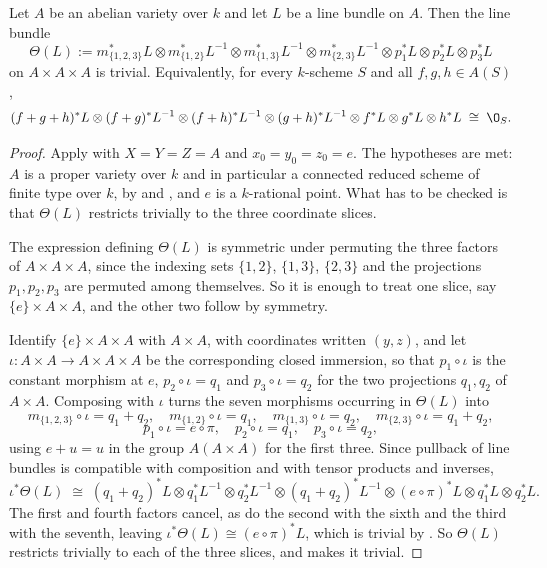 \begin{theorem}
\label{thm:cube-abelian}
Let $A$ be an abelian variety over $k$ and let $L$ be a line bundle on $A$.
Then the line bundle
\[
  \Theta(L):=m_{\{1,2,3\}}^*L\otimes m_{\{1,2\}}^*L^{-1}\otimes
  m_{\{1,3\}}^*L^{-1}\otimes m_{\{2,3\}}^*L^{-1}\otimes
  p_1^*L\otimes p_2^*L\otimes p_3^*L
\]
on $A\times A\times A$ is trivial.  Equivalently, for every $k$-scheme $S$ and
all $f,g,h\in A(S)$,
\[
  (f+g+h)^*L\otimes(f+g)^*L^{-1}\otimes(f+h)^*L^{-1}\otimes(g+h)^*L^{-1}
  \otimes f^*L\otimes g^*L\otimes h^*L\;\cong\;\O_S .
\]
\end{theorem}
\begin{proof}
Apply  with $X=Y=Z=A$ and $x_0=y_0=z_0=e$.  The hypotheses
are met: $A$ is a proper variety over $k$ and in particular a connected reduced
scheme of finite type over $k$, by  and
, and $e$ is a $k$-rational point.  What has to be checked
is that $\Theta(L)$ restricts trivially to the three coordinate slices.

The expression defining $\Theta(L)$ is symmetric under permuting the three
factors of $A\times A\times A$, since the indexing sets $\{1,2\}$, $\{1,3\}$,
$\{2,3\}$ and the projections $p_1,p_2,p_3$ are permuted among themselves.  So
it is enough to treat one slice, say $\{e\}\times A\times A$, and the other two
follow by symmetry.

Identify $\{e\}\times A\times A$ with $A\times A$, with coordinates written
$(y,z)$, and let $\iota\colon A\times A\to A\times A\times A$ be the
corresponding closed immersion, so that $p_1\circ\iota$ is the constant
morphism at $e$, $p_2\circ\iota=q_1$ and $p_3\circ\iota=q_2$ for the two
projections $q_1,q_2$ of $A\times A$.  Composing with $\iota$ turns the seven
morphisms occurring in $\Theta(L)$ into
\[
  m_{\{1,2,3\}}\circ\iota=q_1+q_2,\quad
  m_{\{1,2\}}\circ\iota=q_1,\quad
  m_{\{1,3\}}\circ\iota=q_2,\quad
  m_{\{2,3\}}\circ\iota=q_1+q_2,
\]
\[
  p_1\circ\iota=e\circ\pi,\quad p_2\circ\iota=q_1,\quad p_3\circ\iota=q_2 ,
\]
using $e+u=u$ in the group $A(A\times A)$ for the first three.  Since pullback
of line bundles is compatible with composition and with tensor products and
inverses,
\[
  \iota^*\Theta(L)\;\cong\;
  (q_1+q_2)^*L\otimes q_1^*L^{-1}\otimes q_2^*L^{-1}\otimes
  (q_1+q_2)^*L^{-1}\otimes(e\circ\pi)^*L\otimes q_1^*L\otimes q_2^*L .
\]
The first and fourth factors cancel, as do the second with the sixth and the
third with the seventh, leaving $\iota^*\Theta(L)\cong(e\circ\pi)^*L$, which is
trivial by .  So $\Theta(L)$ restricts
trivially to each of the three slices, and  makes it
trivial.


\end{proof}
